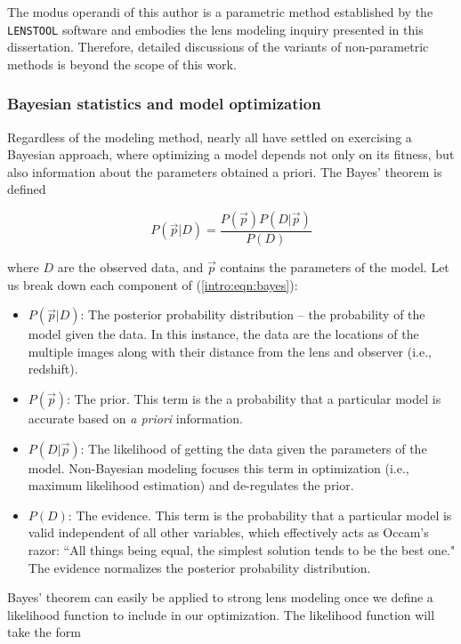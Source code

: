 The modus operandi of this author is a parametric method established by the \texttt{LENSTOOL} software \citep{Jullo:2007lr} and embodies the lens modeling inquiry presented in this dissertation. Therefore, detailed discussions of the variants of non-parametric methods is beyond the scope of this work.

\subsubsection{Bayesian statistics and model optimization}

Regardless of the modeling method, nearly all have settled on exercising a Bayesian approach, where optimizing a model depends not only on its fitness, but also information about the parameters obtained a priori. The Bayes' theorem is defined

\begin{equation}
P(\vec{p} | D ) = \frac{P(\vec{p}) P(D | \vec{p} ) }{P(D)}
\label{intro:eqn:bayes}
\end{equation}

\noindent where $D$ are the observed data, and $\vec{p}$ contains the parameters of the model. Let us break down each component of (\ref{intro:eqn:bayes}):

\begin{itemize}
\item $P(\vec{p} | D )$: The posterior probability distribution -- the probability of the model given the data. In this instance, the data are the locations of the multiple images along with their distance from the lens and observer (i.e., redshift).
\item $P(\vec{p})$: The prior. This term is the a probability that a particular model is accurate based on {\it a priori} information.
\item $P(D | \vec{p} )$:  The likelihood of getting the data given the parameters of the model. Non-Bayesian modeling focuses this term in optimization (i.e., maximum likelihood estimation) and de-regulates the prior.
\item $P(D)$: The evidence. This term is the probability that a particular model is valid independent of all other variables, which effectively acts as Occam's razor: ``All things being equal, the simplest solution tends to be the best one." The evidence normalizes the posterior probability distribution.
\end{itemize}

Bayes' theorem can easily be applied to strong lens modeling once we define a likelihood function to include in our optimization. The likelihood function will take the form

